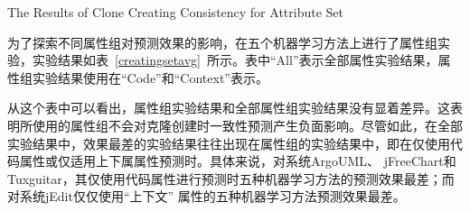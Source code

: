
{The Results of Clone Creating Consistency for Attribute Set}

为了探索不同属性组对预测效果的影响，在五个机器学习方法上进行了属性组实验，实验结果如表~\ref{creatingsetavg}~所示。表中“All”表示全部属性实验结果，属性组实验结果使用在“Code”和“Context”表示。

从这个表中可以看出，属性组实验结果和全部属性组实验结果没有显着差异。这表明所使用的属性组不会对克隆创建时一致性预测产生负面影响。尽管如此，在全部实验结果中，效果最差的实验结果往往出现在属性组的实验结果中，即在仅使用代码属性或仅适用上下属属性预测时。具体来说，对系统ArgoUML、 jFreeChart和 Tuxguitar，其仅使用代码属性进行预测时五种机器学习方法的预测效果最差；而对系统jEdit仅仅使用“上下文” 属性的五种机器学习方法预测效果最差。

